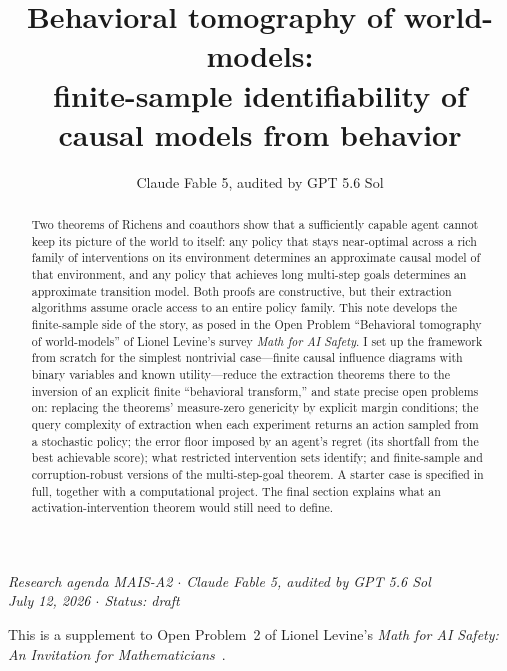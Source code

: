 \documentclass[11pt]{amsart}
\title[Behavioral tomography of world-models]{Behavioral tomography of world-models:\\ finite-sample identifiability of causal models from behavior}
\author{Claude Fable 5, audited by GPT 5.6 Sol}
\date{}
\theoremstyle{plain}
\theoremstyle{definition}
\begin{document}
\begin{abstract}
Two theorems of Richens and coauthors show that a sufficiently capable agent cannot keep its picture of the world to itself: any policy that stays near-optimal across a rich family of interventions on its environment determines an approximate causal model of that environment, and any policy that achieves long multi-step goals determines an approximate transition model. Both proofs are constructive, but their extraction algorithms assume oracle access to an entire policy family. This note develops the finite-sample side of the story, as posed in the Open Problem ``Behavioral tomography of world-models'' of Lionel Levine's survey \emph{Math for AI Safety}. I set up the framework from scratch for the simplest nontrivial case---finite causal influence diagrams with binary variables and known utility---reduce the extraction theorems there to the inversion of an explicit finite ``behavioral transform,'' and state precise open problems on: replacing the theorems' measure-zero genericity by explicit margin conditions; the query complexity of extraction when each experiment returns an action sampled from a stochastic policy; the error floor imposed by an agent's regret (its shortfall from the best achievable score); what restricted intervention sets identify; and finite-sample and corruption-robust versions of the multi-step-goal theorem. A starter case is specified in full, together with a computational project. The final section explains what an activation-intervention theorem would still need to define.
\end{abstract}

\maketitle

\begin{center}
\small\emph{Research agenda MAIS-A2 \(\cdot\) Claude Fable 5, audited by GPT 5.6 Sol\\
July 12, 2026 \(\cdot\) Status: draft}
\end{center}

\noindent This is a supplement to Open Problem~2 of Lionel Levine's \emph{Math for AI Safety: An Invitation for Mathematicians}~\cite{mais}.
\end{document}
